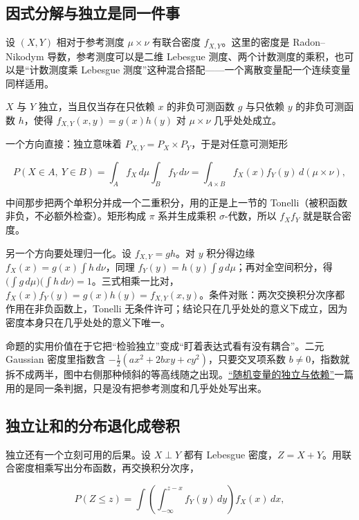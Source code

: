 \subsection{因式分解与独立是同一件事}

设 \((X,Y)\) 相对于参考测度 \(\mu\times\nu\) 有联合密度 \(f_{X,Y}\)。这里的密度是 Radon--Nikodym 导数，参考测度可以是二维 Lebesgue 测度、两个计数测度的乘积，也可以是``计数测度乘 Lebesgue 测度''这种混合搭配——一个离散变量配一个连续变量同样适用。

\begin{proposition}
\(X\) 与 \(Y\) 独立，当且仅当存在只依赖 \(x\) 的非负可测函数 \(g\) 与只依赖 \(y\) 的非负可测函数 \(h\)，使得 \(f_{X,Y}(x,y)=g(x)h(y)\) 对 \(\mu\times\nu\) 几乎处处成立。
\end{proposition}

一个方向直接：独立意味着 \(P_{X,Y}=P_X\times P_Y\)，于是对任意可测矩形

\[
P(X\in A,\ Y\in B)
=\int_A f_X\,d\mu\int_B f_Y\,d\nu
=\int_{A\times B}f_X(x)f_Y(y)\,d(\mu\times\nu),
\]

中间那步把两个单积分并成一个二重积分，用的正是上一节的 Tonelli（被积函数非负，不必额外检查）。矩形构成 \(\pi\) 系并生成乘积 \(\sigma\)-代数，所以 \(f_Xf_Y\) 就是联合密度。

另一个方向要处理归一化。设 \(f_{X,Y}=gh\)。对 \(y\) 积分得边缘 \(f_X(x)=g(x)\int h\,d\nu\)，同理 \(f_Y(y)=h(y)\int g\,d\mu\)；再对全空间积分，得 \(\bigl(\int g\,d\mu\bigr)\bigl(\int h\,d\nu\bigr)=1\)。三式相乘一比对，\(f_X(x)f_Y(y)=g(x)h(y)=f_{X,Y}(x,y)\)。条件对账：两次交换积分次序都作用在非负函数上，Tonelli 无条件许可；结论只在几乎处处的意义下成立，因为密度本身只在几乎处处的意义下唯一。

命题的实用价值在于它把``检验独立''变成``盯着表达式看有没有耦合''。二元 Gaussian 密度里指数含 \(-\tfrac12(ax^2+2bxy+cy^2)\)，只要交叉项系数 \(b\neq0\)，指数就拆不成两半，图中右侧那种倾斜的等高线随之出现。\hyperref[sec:05-Probability/05-Joint-Distributions/02]{``随机变量的独立与依赖''}一篇用的是同一条判据，只是没有把参考测度和几乎处处写出来。

\subsection{独立让和的分布退化成卷积}

独立还有一个立刻可用的后果。设 \(X\perp Y\) 都有 Lebesgue 密度，\(Z=X+Y\)。用联合密度相乘写出分布函数，再交换积分次序，

\[
P(Z\le z)=\int\!\left(\int_{-\infty}^{z-x}f_Y(y)\,dy\right)f_X(x)\,dx ,
\]

